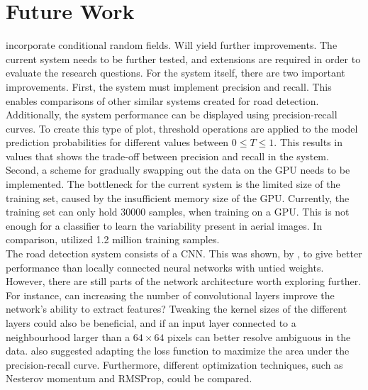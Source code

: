 \section{Future Work}
\label{sec:futureWork}
incorporate conditional random fields. Will yield further improvements.
The current system needs to be further tested, and extensions are required in order to evaluate the research questions. For the system itself, there are two important improvements. First, the system must implement precision and recall. This enables comparisons of other similar systems created for road detection. Additionally, the system performance can be displayed using precision-recall curves. To create this type of plot, threshold operations are applied to the model prediction probabilities for different values between $0 \leq T \leq 1$. This results in values that shows the trade-off between precision and recall in the system. Second, a scheme for gradually swapping out the data on the \ac{GPU} needs to be implemented. The bottleneck for the current system is the limited size of the training set, caused by the insufficient memory size of the \ac{GPU}. Currently, the training set can only hold 30000 samples, when training on a \ac{GPU}. This is not enough for a classifier to learn the variability present in aerial images. In comparison, \cite{Mnih_roads_high_res_aerial_images} utilized 1.2 million training samples.\\

The road detection system consists of a \ac{CNN}. This was shown, by \cite{MnihThesis}, to give better performance than locally connected neural networks with untied weights. However, there are still parts of the network architecture worth exploring further. For instance, can increasing the number of convolutional layers improve the network's ability to extract features? Tweaking the kernel sizes of the different layers could also be beneficial, and if an input layer connected to a neighbourhood larger than a $64 \times 64$ pixels can better resolve ambiguous in the data. \cite{MnihThesis} also suggested adapting the loss function to maximize the area under the precision-recall curve. Furthermore, different optimization techniques, such as Nesterov momentum and RMSProp, could be compared.\\


